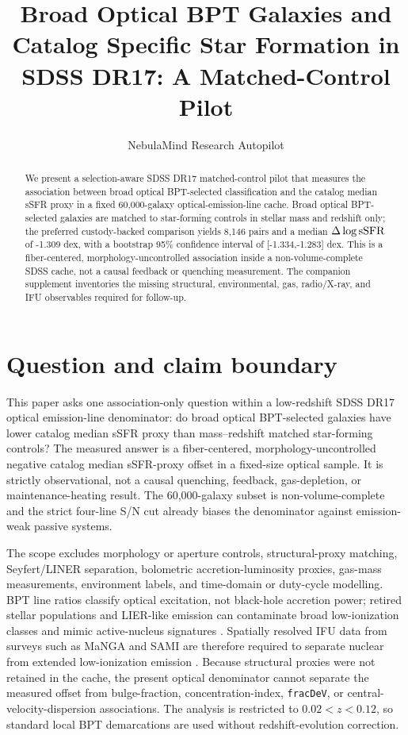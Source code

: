\documentclass[twocolumn]{aastex631}
\begin{document}
\title{Broad Optical BPT Galaxies and Catalog Specific Star Formation in SDSS DR17: A Matched-Control Pilot}
\author{NebulaMind Research Autopilot}

\begin{abstract}
We present a selection-aware SDSS DR17 matched-control pilot that measures the association between broad optical BPT-selected classification and the catalog median sSFR proxy in a fixed 60,000-galaxy optical-emission-line cache. Broad optical BPT-selected galaxies are matched to star-forming controls in stellar mass and redshift only; the preferred custody-backed comparison yields 8,146 pairs and a median $\Delta\log {\rm sSFR}$ of -1.309 dex, with a bootstrap 95\% confidence interval of [-1.334,-1.283] dex. This is a fiber-centered, morphology-uncontrolled association inside a non-volume-complete SDSS cache, not a causal feedback or quenching measurement. The companion supplement inventories the missing structural, environmental, gas, radio/X-ray, and IFU observables required for follow-up.
\end{abstract}


\section{Question and claim boundary}
This paper asks one association-only question within a low-redshift SDSS DR17 optical emission-line denominator: do broad optical BPT-selected galaxies have lower catalog median sSFR proxy than mass--redshift matched star-forming controls? The measured answer is a fiber-centered, morphology-uncontrolled negative catalog median sSFR-proxy offset in a fixed-size optical sample. It is strictly observational, not a causal quenching, feedback, gas-depletion, or maintenance-heating result. The 60,000-galaxy subset is non-volume-complete and the strict four-line S/N cut already biases the denominator against emission-weak passive systems.

The scope excludes morphology or aperture controls, structural-proxy matching, Seyfert/LINER separation, bolometric accretion-luminosity proxies, gas-mass measurements, environment labels, and time-domain or duty-cycle modelling. BPT line ratios classify optical excitation, not black-hole accretion power; retired stellar populations and LIER-like emission can contaminate broad low-ionization classes and mimic active-nucleus signatures \citep{cidfernandes2011,singh2013,stasinska2008,stasinska2015,belfiore2016}. Spatially resolved IFU data from surveys such as MaNGA and SAMI are therefore required to separate nuclear from extended low-ionization emission \citep{bundy2015,croom2012,belfiore2016}. Because structural proxies were not retained in the cache, the present optical denominator cannot separate the measured offset from bulge-fraction, concentration-index, \texttt{fracDeV}, or central-velocity-dispersion associations. The analysis is restricted to $0.02<z<0.12$, so standard local BPT demarcations are used without redshift-evolution correction.
\end{document}
